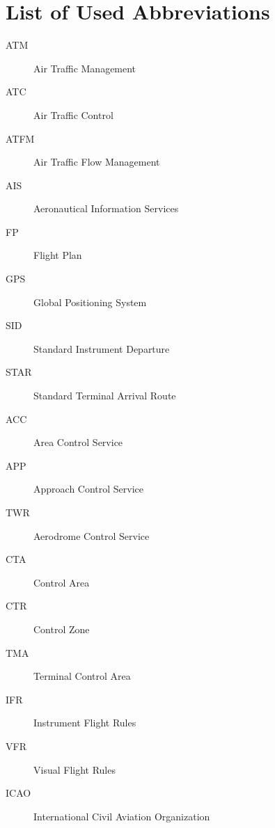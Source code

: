 \chapter{List of Used Abbreviations}

\begin{description}
\item[ATM] Air Traffic Management
\item[ATC] Air Traffic Control
\item[ATFM] Air Traffic Flow Management
\item[AIS] Aeronautical Information Services
\item[FP] Flight Plan
\item[GPS] Global Positioning System
\item[SID] Standard Instrument Departure
\item[STAR] Standard Terminal Arrival Route
\item[ACC] Area Control Service
\item[APP] Approach Control Service
\item[TWR] Aerodrome Control Service
\item[CTA] Control Area
\item[CTR] Control Zone
\item[TMA] Terminal Control Area
\item[IFR] Instrument Flight Rules
\item[VFR] Visual Flight Rules
\item[ICAO] International Civil Aviation Organization

\end{description}